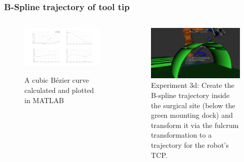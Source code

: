 \begin{frame}
\frametitle{B-Spline trajectory of tool tip}
\begin{columns}
\begin{center}
\begin{figure}[!htb]
\centering
\includegraphics[width=\textwidth]{../images/bezier_path.png}\\
\caption{A cubic B\'ezier curve calculated and plotted in MATLAB} 
\end{figure}
\end{center}

\begin{center}
\begin{figure}[!htb]
\centering
\includegraphics[width=\textwidth]{../images/robot_planner3/3d_bezier_spline.png}
\caption{Experiment 3d: Create the B-spline trajectory inside the surgical site (below the green mounting dock) and transform it via the fulcrum transformation to a trajectory for the robot's TCP.}
\label{robot-planner3d-bezier-spline}
\end{figure}
\end{center}

\end{columns}
\end{frame}



